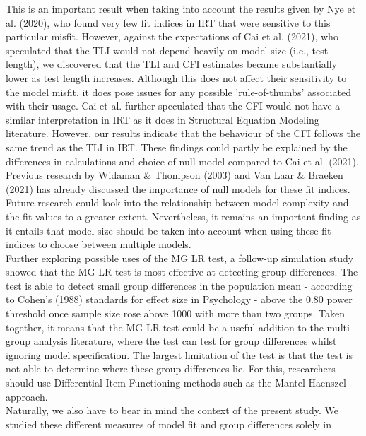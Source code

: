\documentclass[Royal,sageapa,times,doublespace]{sagej}
\begin{document}
This is an important result when taking into account the results given by Nye et al. (2020), who found very few fit indices in IRT that were sensitive to this particular misfit. However, against the expectations of Cai et al. (2021), who speculated that the TLI would not depend heavily on model size (i.e., test length), we discovered that the TLI and CFI estimates became substantially lower as test length increases. Although this does not affect their sensitivity to the model misfit, it does pose issues for any possible 'rule-of-thumbs' associated with their usage. Cai et al. further speculated that the CFI would not have a similar interpretation in IRT as it does in Structural Equation Modeling literature. However, our results indicate that the behaviour of the CFI follows the same trend as the TLI in IRT. %
These findings could partly be explained by the differences in calculations and choice of null model compared to Cai et al. (2021). Previous research by Widaman \& Thompson (2003) and Van Laar \& Braeken (2021) has already discussed the importance of null models for these fit indices. Future research could look into the relationship between model complexity and the fit values to a greater extent. Nevertheless, it remains an important finding as it entails that model size should be taken into account when using these fit indices to choose between multiple models. \\
\indent Further exploring possible uses of the MG LR test, a follow-up simulation study showed that the MG LR test is most effective at detecting group differences. The test is able to detect small group differences in the population mean - according to Cohen's (1988) standards for effect size in Psychology - above the 0.80 power threshold once sample size rose above 1000 with more than two groups. Taken together, it means that the MG LR test could be a useful addition to the multi-group analysis literature, where the test can test for group differences whilst ignoring model specification. The largest limitation of the test is that the test is not able to determine where these group differences lie. For this, researchers should use Differential Item Functioning methods such as the Mantel-Haenszel approach. \\
\indent Naturally, we also have to bear in mind the context of the present study. We studied these different measures of model fit and group differences solely in 
\end{document}
